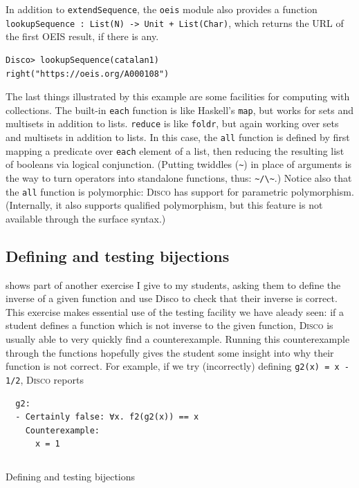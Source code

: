 \documentclass[submission,copyright,creativecommons]{eptcs}
\newcommand{\disco}{\textsc{Disco}\xspace}
\newcommand{\pref}[1]{\prettyref{#1}}
\begin{document}
In addition to \texttt{extendSequence}, the \texttt{oeis} module also
provides a function \texttt{lookupSequence : List(N) -> Unit +
  List(Char)}, which returns the URL of the first OEIS result, if
there is any.
\begin{verbatim}
Disco> lookupSequence(catalan1)
right("https://oeis.org/A000108")
\end{verbatim}

The last things illustrated by this example are some facilities for
computing with collections.  The built-in \texttt{each} function is
like Haskell's \texttt{map}, but works for sets and multisets in
addition to lists.  \texttt{reduce} is like \texttt{foldr}, but again
working over sets and multisets in addition to lists.  In this case,
the \texttt{all} function is defined by first mapping a predicate over
\texttt{each} element of a list, then reducing the resulting list of
booleans via logical conjunction.  (Putting twiddles (\verb|~|) in
place of arguments is the way to turn operators into standalone
functions, thus: \verb|~/\~|.)  Notice also that the \texttt{all}
function is polymorphic: \disco has support for parametric
polymorphism.  (Internally, it also supports qualified polymorphism,
but this feature is not available through the surface syntax.)

\subsection{Defining and testing bijections}

\pref{lst:bijection} shows part of another exercise I give to my
students, asking them to define the inverse of a given function and
use Disco to check that their inverse is correct.  This exercise makes
essential use of the testing facility we have aleady seen: if a
student defines a function which is not inverse to the given function,
\disco is usually able to very quickly find a counterexample.  Running
this counterexample through the functions hopefully gives the student
some insight into why their function is not correct.  For example, if
we try (incorrectly) defining \texttt{g2(x) = x - 1/2}, \disco reports
\begin{verbatim}
  g2:
  - Certainly false: ∀x. f2(g2(x)) == x
    Counterexample:
      x = 1
\end{verbatim}

\begin{listing}
  \inputminted{text}{examples/bijection.disco}
  \caption{Defining and testing bijections}
  \label{lst:bijection}
\end{listing}
\end{document}
